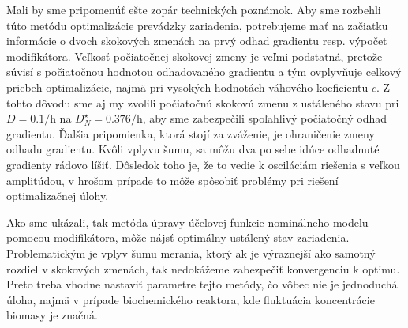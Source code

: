 Mali by sme pripomenúť ešte zopár technických poznámok. Aby sme rozbehli túto metódu optimalizácie prevádzky zariadenia, potrebujeme mať na začiatku informácie o dvoch skokových zmenách na prvý odhad gradientu resp. výpočet modifikátora. Veľkosť počiatočnej skokovej zmeny je veľmi podstatná, pretože súvisí s počiatočnou hodnotou odhadovaného gradientu a tým ovplyvňuje celkový priebeh optimalizácie, najmä pri vysokých hodnotách váhového koeficientu $ c $. Z tohto dôvodu sme aj my zvolili počiatočnú skokovú zmenu z ustáleného stavu pri $ D = 0.1\si{\per\hour} $ na $ D_{N}^{\star} = 0.376\si{\per\hour} $, aby sme zabezpečili spoľahlivý počiatočný odhad gradientu. Ďalšia pripomienka, ktorá stojí za zváženie, je ohraničenie zmeny odhadu gradientu. Kvôli vplyvu šumu, sa môžu dva po sebe idúce odhadnuté gradienty rádovo líšiť. Dôsledok toho je, že to vedie k osciláciám riešenia s veľkou amplitúdou,
v hrošom prípade to môže spôsobiť problémy pri riešení optimalizačnej úlohy. 

Ako sme ukázali, tak metóda úpravy účelovej funkcie nominálneho modelu pomocou modifikátora, môže nájsť optimálny ustálený stav zariadenia. Problematickým je vplyv šumu merania, ktorý ak je výraznejší ako samotný rozdiel v skokových zmenách, tak nedokážeme zabezpečiť konvergenciu k optimu. Preto treba vhodne nastaviť parametre tejto metódy, čo vôbec nie je jednoduchá úloha, najmä v prípade biochemického reaktora, kde fluktuácia koncentrácie biomasy je značná.
